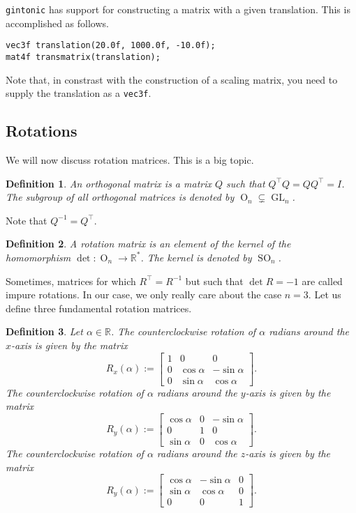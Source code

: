 \documentclass{article}
\newtheorem{definition}{Definition}
\DeclareMathOperator{\GL}{GL}
\DeclareMathOperator{\OrthogonalGroup}{O}
\DeclareMathOperator{\SO}{SO}
\begin{document}
\texttt{gintonic} has support for constructing a matrix with a given translation. This is accomplished as follows.

\begin{lstlisting}
vec3f translation(20.0f, 1000.0f, -10.0f);
mat4f transmatrix(translation);
\end{lstlisting}
Note that, in constrast with the construction of a scaling matrix, you need to supply the translation as a \texttt{vec3f}.

\subsection{Rotations}

We will now discuss rotation matrices. This is a big topic.

\begin{definition}
An orthogonal matrix is a matrix $Q$ such that $Q^\intercal Q = Q Q^\intercal = I$. The subgroup of all orthogonal matrices is denoted by $\OrthogonalGroup_n \subsetneq \GL_n$.
\end{definition}
Note that $Q^{-1} = Q^\intercal$.
\begin{definition}
A rotation matrix is an element of the kernel of the homomorphism $\det : \OrthogonalGroup_n \to \mathbb{R}^*$. The kernel is denoted by $\SO_n$.
\end{definition}
Sometimes, matrices for which $R^\intercal = R^{-1}$ but such that $\det R = -1$ are called impure rotations. In our case, we only really care about the case $n=3$. Let us define three fundamental rotation matrices.
\begin{definition}
Let $\alpha \in \mathbb{R}$. The counterclockwise rotation of $\alpha$ radians around the $x$-axis is given by the matrix
\[ R_x(\alpha) := \begin{bmatrix} 1 & 0 & 0 \\ 0 & \cos \alpha & -\sin \alpha \\ 0 & \sin \alpha & \cos \alpha \end{bmatrix}. \]
The counterclockwise rotation of $\alpha$ radians around the $y$-axis is given by the matrix
\[ R_y(\alpha) := \begin{bmatrix} \cos \alpha & 0 & -\sin \alpha \\ 0 & 1 & 0 \\ \sin \alpha & 0 & \cos \alpha \end{bmatrix}. \]
The counterclockwise rotation of $\alpha$ radians around the $z$-axis is given by the matrix
\[ R_y(\alpha) := \begin{bmatrix} \cos \alpha & -\sin \alpha & 0 \\ \sin \alpha & \cos \alpha & 0 \\ 0 & 0 & 1 \end{bmatrix}. \]
\end{definition}
\end{document}
